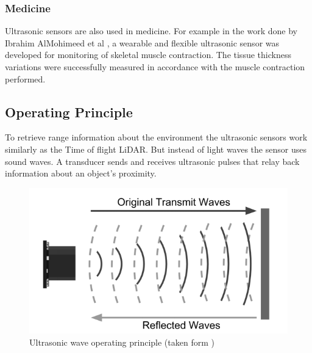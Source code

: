 \subsubsection{Medicine}
Ultrasonic sensors are also used in medicine. For example in the work done by Ibrahim AlMohimeed et al \cite{med}, a wearable and flexible ultrasonic sensor was developed for monitoring of skeletal muscle contraction. The tissue thickness variations were successfully measured in accordance with the muscle contraction performed. 
\subsection{Operating Principle}
To retrieve range information about the environment the ultrasonic sensors work similarly as the  Time of flight \ac{LiDAR}. But instead of light waves the sensor uses sound waves. A transducer sends and receives ultrasonic pulses that relay back information about an object’s proximity.  

\begin{figure}[ht] 
\centerline{\includegraphics [width=0.8 \textwidth]{imgs/chapter2/us.png}}
\caption[Ultrasonic wave operating principle]{Ultrasonic wave operating principle (taken form \cite{burnett2019})}
\label{fig:us}
\end{figure}

